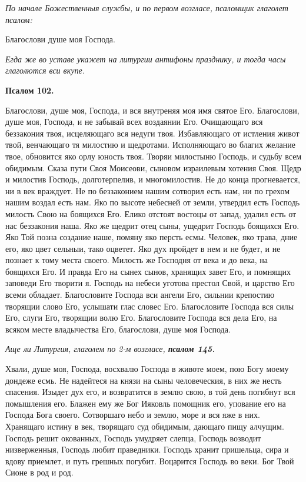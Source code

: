 \itshape По начале Божественныя службы, и по первом возгласе, псаломщик глаголет псалом:\normalfont{}


Благослови душе моя Господа. 

\itshape Егда же во уставе укажет на литургии антифоны празднику, и тогда часы глаголются вси вкупе.\normalfont{}


\medskip


\bfseries Псалом 102.\normalfont{}


Благослови, душе моя, Господа, и вся внутреняя моя имя святое Его. Благослови, душе моя, Господа, и не забывай всех воздаянии Его. Очищающаго вся беззакония твоя, исцеляющаго вся недуги твоя. Избавляющаго от истления живот твой, венчающаго тя милостию и щедротами. Исполняющаго во благих желание твое, обновится яко орлу юность твоя. Творяи милостыню Господь, и судьбу всем обидимым. Сказа пути Своя Моисеови, сыновом израилевым хотения Своя. Щедр и милостив Господь, долготерпелив, и многомилостив. Не до конца прогневается, ни в век враждует. Не по беззаконием нашим сотворил есть нам, ни по грехом нашим воздал есть нам. Яко по высоте небесней от земли, утвердил есть Господь милость Свою на боящихся Его. Елико отстоят востоцы от запад, удалил есть от нас беззакония наша. Яко же щедрит отец сыны, ущедрит Господь боящихся Его. Яко Той позна создание наше, помяну яко персть есмы. Человек, яко трава, дние его, яко цвет сельныи, тако оцветет. Яко дух пройдет в нем и не будет, и не познает к тому места своего. Милость же Господня от века и до века, на боящихся Его. И правда Его на сынех сынов, хранящих завет Его, и помнящих заповеди Его творити я. Господь на небеси уготова престол Свой, и царство Его всеми обладает. Благословите Господа вси ангели Его, сильнии крепостию творящии слово Его, услышати глас словес Его. Благословите Господа вся силы Его, слуги Его, творящии волю Его. Благословите Господа вся дела Его, на всяком месте владычества Его, благослови, душе моя Господа.


\medskip


\itshape Аще ли Литургия, глаголем по 2-м возгласе, \bfseries псалом 145\normalfont{}.\normalfont{}


Хвали, душе моя, Господа, восхвалю Господа в животе моем, пою Богу моему дондеже есмь. Не надейтеся на князи на сыны человеческия, в них же несть спасения. Изыдет дух его, и возвратится в землю свою, в той день погибнут вся помышления его. Блажен ему же Бог Ияковль помощник его, упование его на Господа Бога своего. Сотворшаго небо и землю, море и вся яже в них. Хранящаго истину в век, творящаго суд обидимым, дающаго пищу алчущим. Господь решит окованных, Господь умудряет слепца, Господь возводит низверженныя, Господь любит праведники. Господь хранит пришельца, сира и вдову приемлет, и путь грешных погубит. Воцарится Господь во веки. Бог Твой Сионе в род и род. 


